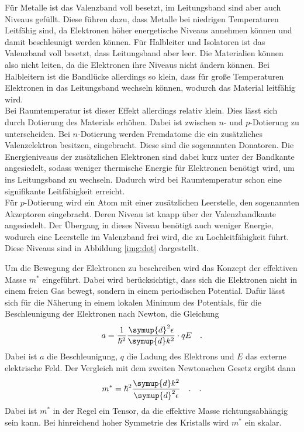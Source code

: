 \noindent
Für Metalle ist das Valenzband voll besetzt, im Leitungsband sind aber auch Niveaus gefüllt. 
Diese führen dazu, dass Metalle bei niedrigen Temperaturen Leitfähig sind, da Elektronen höher energetische Niveaus annehmen können und damit beschleunigt werden können.
Für Halbleiter und Isolatoren ist das Valenzband voll besetzt, dass Leitungsband aber leer. Die Materialien können also nicht leiten, da die Elektronen ihre Niveaus nicht ändern können.
Bei Halbleitern ist die Bandlücke allerdings so klein, dass für große Temperaturen Elektronen in das Leitungsband wechseln können, wodurch das Material leitfähig wird.\\
Bei Raumtemperatur ist dieser Effekt allerdings relativ klein. Dies lässt sich durch Dotierung des Materials erhöhen. Dabei ist zwischen $n$- und $p$-Dotierung zu unterscheiden.
Bei $n$-Dotierung werden Fremdatome die ein zusätzliches Valenzelektron besitzen, eingebracht. Diese sind die sogenannten Donatoren. 
Die Energieniveaus der zusätzlichen Elektronen sind dabei kurz unter der Bandkante angesiedelt, sodass weniger thermische Energie für Elektronen benötigt wird, um ins Leitungsband zu wechseln.
Dadurch wird bei Raumtemperatur schon eine signifikante Leitfähigkeit erreicht.\\
Für $p$-Dotierung wird ein Atom mit einer zusätzlichen Leerstelle, den sogenannten Akzeptoren eingebracht.
Deren Niveau ist knapp über der Valenzbandkante angesiedelt. Der Übergang in dieses Niveau benötigt auch weniger Energie, wodurch eine Leerstelle im Valenzband frei wird, die zu Lochleitfähigkeit führt.
Diese Niveaus sind in Abbildung \ref{img:dot} dargestellt. 



\noindent
Um die Bewegung der Elektronen zu beschreiben wird das Konzept der effektiven Masse $m^*$ eingeführt. 
Dabei wird berücksichtigt, dass sich die Elektronen nicht in einem freien Gas bewegt, sondern in einem periodischen Potential. 
Dafür lässt sich für die Näherung in einem lokalen Minimum des Potentials, für die Beschleunigung der Elektronen nach Newton, die Gleichung
\begin{equation*}
    a = \frac{1}{\hslash^2}\frac{\symup{d}^2\epsilon}{\symup{d}k^2} \cdot qE \quad .
\end{equation*} 
Dabei ist $a$ die Beschleunigung, $q$ die Ladung des Elektrons und $E$ das externe elektrische Feld.
Der Vergleich mit dem zweiten Newtonschen Gesetz ergibt dann
\begin{equation*}
    m^* =  \hbar^2 \frac{\symup{d}k^2}{\symup{d}^2\epsilon}\quad.
    \quad .
\end{equation*} 
Dabei ist $m^*$ in der Regel ein Tensor, da die effektive Masse richtungsabhängig sein kann.
Bei hinreichend hoher Symmetrie des Kristalls wird $m^*$ ein skalar. 



